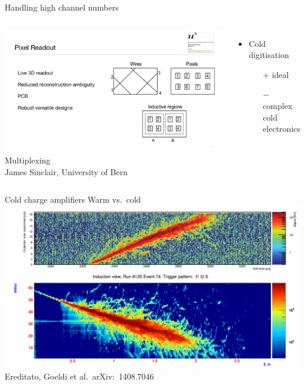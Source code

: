 \documentclass[]{beamer}
\newcommand*{\emphcol}{blue}
\begin{document}
\begin{frame}{Handling high channel numbers}
	\begin{columns}[c]
		\centering
		\includegraphics[page=1, viewport=930 90 1850 800, clip, width=\textwidth]{defence/Pixels}\\
		Multiplexing\\
		{\tiny James Sinclair, University of Bern}\\
		\begin{itemize}
			\item {\color{\emphcol} Cold digitisation}
			\begin{itemize}
				\item[$+$] ideal
				\item[$-$] complex cold electronics
			\end{itemize}
		\end{itemize}
	\end{columns}
\end{frame}

\begin{frame}{Cold charge amplifiers}{\color{\emphcol} Warm vs.\ cold}
	\centering
	\includegraphics[width=\textwidth]{defence/AT_warmPreamps}\\
	\includegraphics[width=\textwidth]{defence/AT_coldPreamps}\\
	{\tiny Ereditato, Goeldi et al.\ arXiv:~1408.7046~\cite{larasic}}\\
\end{frame}
\end{document}
